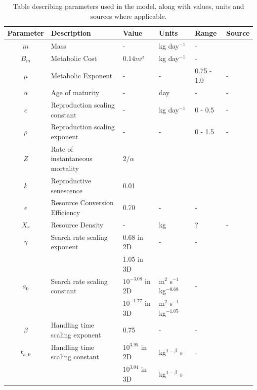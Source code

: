 \documentclass[a4paper, 11pt, hidelinks]{article} %
\begin{document}
	\begin{centering}

			
		\begin{table}[h!]
			\caption{Table describing parameters used in the model, along with values, units and sources where applicable.} %
			\label{parameters}
			\begin{tabular}{c l l l l l}
				\hline
				Parameter 	& Description 			& Value 	& Units 	& Range 		& Source \\
				\hline
				$m$			& Mass					& -			& kg day$^{-1}$& -			&		\\
				
				$B_m$		& Metabolic Cost		& $0.14 m^{\mu}$ & kg day$^{-1}$& - 	& \cite{Peters1983}\\
				$\mu$		& Metabolic Exponent	& -			&	-		& 0.75 - 1.0	& - \\
				$\alpha$	& Age of maturity		& -     	& day		& -				& -\\
				$c$			& Reproduction scaling constant & - & kg day$^{-1}$& 0 - 0.5 		& -\\
				$\rho$		& Reproduction scaling exponent	& -	&	-		& 0 - 1.5			& -\\
				$Z$			& Rate of instantaneous mortality& $2/\alpha$	& & & \cite{Charnov2001}\\%
				$k$			& Reproductive senescence & 0.01\\
				
				$\epsilon$	& Resource Conversion Efficiency & 0.70 & - & - 		& \cite{Peters1983} \\
				$X_r$ 		& Resource Density		& -		& kg		& ?				& -\\
				$\gamma$	& Search rate scaling exponent & 0.68 in 2D	& - & - & \cite{Pawar2012} \\
							&						& 1.05 in 3D\\
				$a_0$		& Search rate scaling constant & $10^{-3.08}$ in 2D & m$^2$ s$^{-1}$ kg$^{-0.68}$   & - &\cite{Pawar2012}	\\
							&						& $10^{-1.77}$ in 3D& m$^2$ s$^{-1}$ kg$^{-1.05} $\\
				$\beta$		& Handling time scaling exponent& 0.75 & - & - & \cite{Pawar2012}\\
				$t_{h, 0}$	& Handling time scaling constant& $10^{3.95}$ in 2D &kg$^{1-\beta}$ s& -& \cite{Pawar2012}	\\
							&						& $10^{3.04}$ in 3D			&kg$^{1-\beta}$ s\\
				\hline
			\end{tabular}
		\end{table}
	\end{centering}
\end{document}
